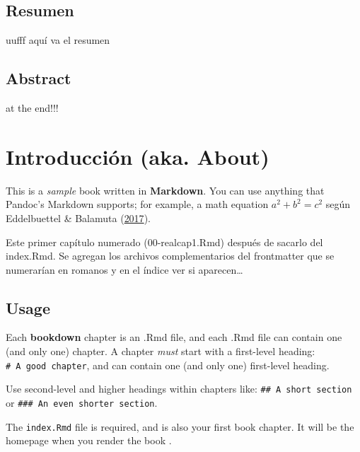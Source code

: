 \documentclass[
  12pt,
]{book}
\theoremstyle{definition}
\theoremstyle{definition}
\theoremstyle{definition}
\theoremstyle{definition}
\theoremstyle{remark}
\begin{document}
\newpage

\hypertarget{resumen}{%
\section*{Resumen}\label{resumen}}

uufff aquí va el resumen

\newpage

\hypertarget{abstract}{%
\section*{Abstract}\label{abstract}}

at the end!!!

\mainmatter

\hypertarget{introducciuxf3n-aka.-about}{%
\chapter{Introducción (aka. About)}\label{introducciuxf3n-aka.-about}}

This is a \emph{sample} book written in \textbf{Markdown}. You can use anything that Pandoc's Markdown supports; for example, a math equation \(a^2 + b^2 = c^2\) según Eddelbuettel \& Balamuta (\protect\hyperlink{ref-eddelbuettel2017ExtendingBrief}{2017}).

Este primer capítulo numerado (00-realcap1.Rmd) después de sacarlo del index.Rmd. Se agregan los archivos complementarios del frontmatter que se numerarían en romanos y en el índice ver si aparecen\ldots{}

\hypertarget{usage}{%
\section{Usage}\label{usage}}

Each \textbf{bookdown} chapter is an .Rmd file, and each .Rmd file can contain one (and only one) chapter. A chapter \emph{must} start with a first-level heading: \texttt{\#\ A\ good\ chapter}, and can contain one (and only one) first-level heading.

Use second-level and higher headings within chapters like: \texttt{\#\#\ A\ short\ section} or \texttt{\#\#\#\ An\ even\ shorter\ section}.

The \texttt{index.Rmd} file is required, and is also your first book chapter. It will be the homepage when you render the book .
\end{document}
